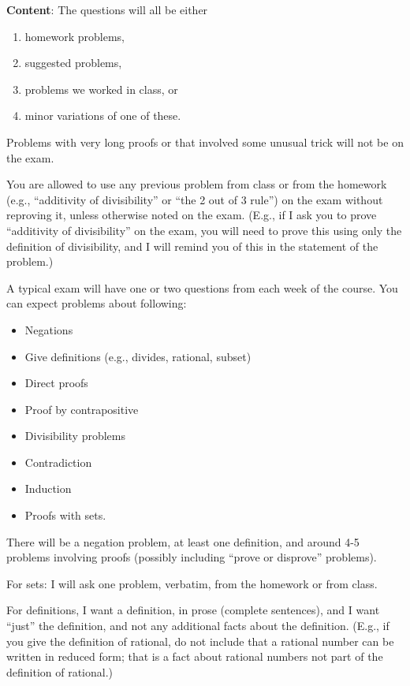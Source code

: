 \documentclass[12pt]{article}
\begin{document}
\noindent \textbf{Content}: The questions will all be either
\begin{enumerate}
\item homework problems,
\item suggested problems,
\item problems we worked in class, or
\item minor variations of one of these.
\end{enumerate}

Problems with very long proofs or that involved some unusual trick will not be on the exam.
\smallskip

You are allowed to use any previous problem from class or from the homework (e.g., ``additivity of divisibility'' or ``the 2 out of 3 rule'') on the exam without reproving it, unless otherwise noted on the exam. (E.g., if I ask you to prove ``additivity of divisibility'' on the exam, you will need to prove this using only the definition of divisibility, and I will remind you of this in the statement of the problem.)
\smallskip

A typical exam will have one or two questions from each week of the course. You can expect problems about following:
\begin{itemize}
\item Negations
\item Give definitions (e.g., divides, rational, subset)
\item Direct proofs
\item Proof by contrapositive
\item Divisibility problems
\item Contradiction
\item Induction
\item Proofs with sets. 
\end{itemize}
There will be a negation problem, at least one definition, and around 4-5 problems involving proofs (possibly including ``prove or disprove'' problems).
\smallskip

For sets: I will ask one problem, verbatim, from the homework or from class.
\smallskip

For definitions, I want a definition, in prose (complete sentences), and I want ``just'' the definition, and not any additional facts about the definition. (E.g., if you give the definition of rational, do not include that a rational number can be written in reduced form; that is a fact about rational numbers not part of the definition of rational.)
\end{document}
